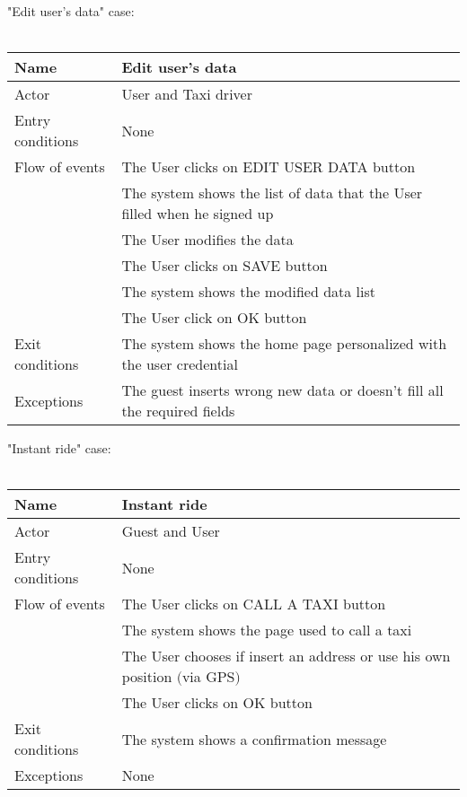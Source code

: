 \newpage
"Edit user's data" case:
\\
\\
\begin{tabular}{|l|p{10cm}|} 
\hline
Name & Edit user's data\\
\hline
Actor & User and Taxi driver\\
\hline
Entry conditions & None\\
\hline
Flow of events
			&	\tabitem The User clicks on EDIT USER DATA button\\
			&	\tabitem The system shows the list of data that the User filled when he signed up\\
			&	\tabitem The User modifies the data\\
			&	\tabitem The User clicks on SAVE button\\
			&	\tabitem The system shows the modified data list\\
			&	\tabitem The User click on OK button\\
\hline
Exit conditions & The system shows the home page personalized with the user credential\\
\hline
Exceptions & The guest inserts wrong new data or doesn't fill all the required fields\\
\hline
\end {tabular}


\newpage
"Instant ride" case:
\\
\\
\begin{tabular}{|l|p{10cm}|} 
\hline
Name & Instant ride\\
\hline
Actor & Guest and User\\
\hline
Entry conditions & None\\
\hline
Flow of events
			&	\tabitem The User clicks on CALL A TAXI button\\
			&	\tabitem The system shows the page used to call a taxi\\
			&	\tabitem The User chooses if insert an address or use his own position $($via GPS$)$\\
			&	\tabitem The User clicks on OK button\\
\hline
Exit conditions & The system shows a confirmation message\\
\hline
Exceptions & None\\
\hline
\end {tabular}


